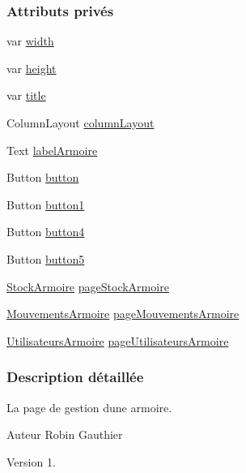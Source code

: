 \subsubsection*{Attributs privés}
\begin{DoxyCompactItemize}
\item 
var \hyperlink{class_menu_armoire_a0bd1e30e6f7a597598c495fa77f4c4b3}{width}
\item 
var \hyperlink{class_menu_armoire_a5f8d483b95b18af416f33996c197f223}{height}
\item 
var \hyperlink{class_menu_armoire_a6387273effb93d80b8badeda2dd940ab}{title}
\item 
Column\+Layout \hyperlink{class_menu_armoire_ac8d82c188a08c32caef5d88434b83f5d}{column\+Layout}
\item 
Text \hyperlink{class_menu_armoire_acd4cffc18ca58abd974dd5e4149120b2}{label\+Armoire}
\item 
Button \hyperlink{class_menu_armoire_a56c6e6408070c8bda3c92288b73d234b}{button}
\item 
Button \hyperlink{class_menu_armoire_a4dce87fc8a7b13a3dabb5d76639eb4d2}{button1}
\item 
Button \hyperlink{class_menu_armoire_acae6e052a4dc6b252b37eb97fc5b414c}{button4}
\item 
Button \hyperlink{class_menu_armoire_a30eceba4ff27b7c9c3c48ed01f3f862d}{button5}
\item 
\hyperlink{class_stock_armoire}{Stock\+Armoire} \hyperlink{class_menu_armoire_a10deb390e6b6afa05e54999da7dc1edd}{page\+Stock\+Armoire}
\item 
\hyperlink{class_mouvements_armoire}{Mouvements\+Armoire} \hyperlink{class_menu_armoire_ac7963ecc1b53a8f8cdf6c972dbd9fbfd}{page\+Mouvements\+Armoire}
\item 
\hyperlink{class_utilisateurs_armoire}{Utilisateurs\+Armoire} \hyperlink{class_menu_armoire_a63fb8f49136de949af59ff65219afc39}{page\+Utilisateurs\+Armoire}
\end{DoxyCompactItemize}


\subsubsection{Description détaillée}
La page de gestion d\textquotesingle{}une armoire.

\begin{DoxyAuthor}{Auteur}
Robin Gauthier
\end{DoxyAuthor}
\begin{DoxyVersion}{Version}
1. 
\end{DoxyVersion}


